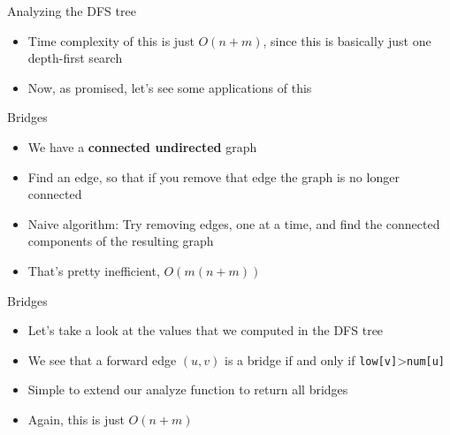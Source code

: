 \documentclass{beamer}
\begin{document}
\begin{frame}[plain]{Analyzing the DFS tree}
    \vspace{30pt}
    \begin{itemize}
        \item Time complexity of this is just $O(n + m)$, since this is basically just one depth-first search
        \vspace{20pt}
        \item Now, as promised, let's see some applications of this
    \end{itemize}
\end{frame}

\begin{frame}[plain]{Bridges}
    \vspace{20pt}
    \begin{itemize}
        \item We have a \textbf{connected undirected} graph
        \item Find an edge, so that if you remove that edge the graph is no longer connected
        \vspace{10pt}
        \item Naive algorithm: Try removing edges, one at a time, and find the connected components of the resulting graph
        \item That's pretty inefficient, $O(m(n + m))$
    \end{itemize}
\end{frame}

\begin{frame}[plain]{Bridges}
    \vspace{20pt}
    \begin{itemize}
        \item Let's take a look at the values that we computed in the DFS tree
        \vspace{10pt}
        \item We see that a forward edge $(u,v)$ is a bridge if and only if \texttt{low[v]}>\texttt{num[u]}
        \vspace{10pt}
        \item Simple to extend our analyze function to return all bridges
        \item Again, this is just $O(n + m)$
    \end{itemize}
\end{frame}
\end{document}
